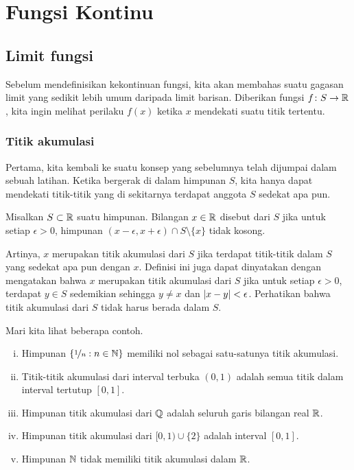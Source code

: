 \chapter{Fungsi Kontinu} \label{lim:chapter}


\section{Limit fungsi}
\label{sec:limoffunc}



Sebelum mendefinisikan kekontinuan fungsi, kita akan membahas suatu gagasan
limit yang sedikit lebih umum daripada limit barisan.
Diberikan fungsi $f \colon S \to
{\mathbb{R}}$, kita ingin melihat perilaku $f(x)$ ketika $x$ mendekati suatu titik tertentu.

\subsection{Titik akumulasi}

Pertama,
kita kembali ke suatu konsep yang sebelumnya telah dijumpai dalam sebuah latihan.
Ketika bergerak di dalam himpunan $S$, kita hanya dapat mendekati titik-titik
yang di sekitarnya terdapat anggota $S$ sedekat apa pun.

\begin{defn}
Misalkan $S \subset {\mathbb{R}}$ suatu himpunan.  Bilangan $x \in {\mathbb{R}}$ disebut
\emph{} dari $S$
jika untuk setiap $\epsilon > 0$, himpunan $(x-\epsilon,x+\epsilon) \cap S
\setminus \{ x \}$ tidak kosong.
\end{defn}

Artinya, $x$ merupakan titik akumulasi dari $S$ jika terdapat titik-titik dalam $S$
yang sedekat apa pun dengan $x$.  Definisi ini juga dapat dinyatakan dengan mengatakan
bahwa $x$ merupakan titik akumulasi dari $S$ jika untuk setiap $\epsilon > 0$, terdapat
$y \in S$ sedemikian sehingga $y \neq x$ dan $\lvert {x - y} \rvert < \epsilon$.
Perhatikan bahwa titik akumulasi dari $S$ tidak harus berada dalam $S$.

Mari kita lihat beberapa contoh.
\begin{enumerate}[(i)]
\item Himpunan
$\{ \nicefrac{1}{n} : n \in {\mathbb{N}} \}$ memiliki nol sebagai satu-satunya titik akumulasi.
\item Titik-titik akumulasi dari interval terbuka $(0,1)$ adalah
semua titik dalam interval tertutup $[0,1]$.
\item
Himpunan titik akumulasi dari ${\mathbb{Q}}$ adalah seluruh garis bilangan real ${\mathbb{R}}$.
\item 
Himpunan titik akumulasi dari $[0,1) \cup \{ 2 \}$ adalah interval $[0,1]$.
\item Himpunan ${\mathbb{N}}$ tidak memiliki titik akumulasi dalam ${\mathbb{R}}$.
\end{enumerate}

